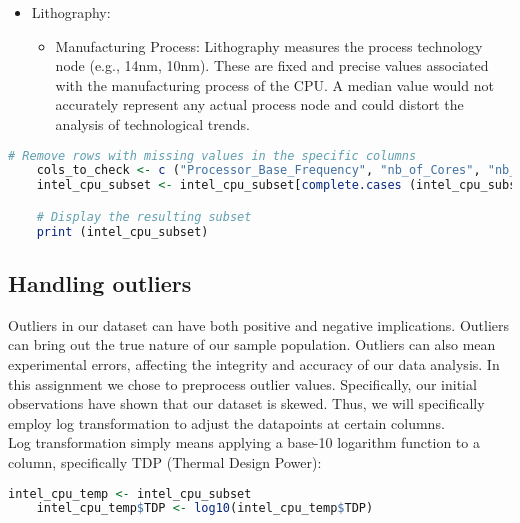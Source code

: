 \begin{itemize}
    \item Lithography:
    \begin{itemize}
        \item Manufacturing Process: Lithography measures the process technology node (e.g., 14nm, 10nm). These are fixed and precise values associated with the manufacturing process of the CPU. A median value would not accurately represent any actual process node and could distort the analysis of technological trends.
    \end{itemize}
\end{itemize}

\begin{lstlisting}[language=R]
    # Remove rows with missing values in the specific columns
    cols_to_check <- c ("Processor_Base_Frequency", "nb_of_Cores", "nb_of_Threads", "TDP", "Lithography")
    intel_cpu_subset <- intel_cpu_subset[complete.cases (intel_cpu_subset[, cols_to_check]), ]

    # Display the resulting subset
    print (intel_cpu_subset)
\end{lstlisting}

\subsection{Handling outliers}

Outliers in our dataset can have both positive and negative implications. Outliers can bring out the true nature of our sample population. Outliers can also mean experimental errors, affecting the integrity and accuracy of our data analysis. In this assignment we chose to preprocess outlier values. Specifically, our initial observations have shown that our dataset is skewed. Thus, we will specifically employ log transformation to adjust the datapoints at certain columns.\\

Log transformation simply means applying a base-10 logarithm function to a column, specifically TDP (Thermal Design Power):
\begin{lstlisting}[language=R]
    intel_cpu_temp <- intel_cpu_subset
    intel_cpu_temp$TDP <- log10(intel_cpu_temp$TDP)
\end{lstlisting}

\newpage